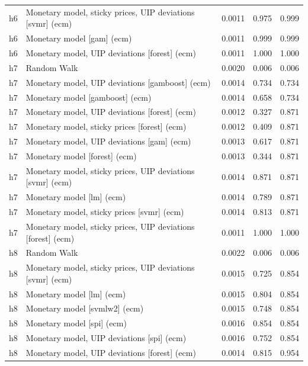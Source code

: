 \begin{ThreePartTable}
\begin{longtable}[t]{cp{5.5cm}ccc}
h6 & \raggedright Monetary model, sticky prices, UIP deviations [svmr] (ecm) & 0.0011 & 0.975 & 0.999\\
h6 & \raggedright Monetary model [gam] (ecm) & 0.0011 & 0.999 & 0.999\\
h6 & \raggedright Monetary model, UIP deviations [forest] (ecm) & 0.0011 & 1.000 & 1.000\\
\addlinespace
h7 & \raggedright Random Walk & 0.0020 & 0.006 & 0.006\\
h7 & \raggedright Monetary model, UIP deviations [gamboost] (ecm) & 0.0014 & 0.734 & 0.734\\
h7 & \raggedright Monetary model [gamboost] (ecm) & 0.0014 & 0.658 & 0.734\\
h7 & \raggedright Monetary model, UIP deviations [forest] (ecm) & 0.0012 & 0.327 & 0.871\\
h7 & \raggedright Monetary model, sticky prices [forest] (ecm) & 0.0012 & 0.409 & 0.871\\
h7 & \raggedright Monetary model, UIP deviations [gam] (ecm) & 0.0013 & 0.617 & 0.871\\
h7 & \raggedright Monetary model [forest] (ecm) & 0.0013 & 0.344 & 0.871\\
h7 & \raggedright Monetary model, sticky prices, UIP deviations [svmr] (ecm) & 0.0014 & 0.871 & 0.871\\
h7 & \raggedright Monetary model [lm] (ecm) & 0.0014 & 0.789 & 0.871\\
h7 & \raggedright Monetary model, sticky prices [svmr] (ecm) & 0.0014 & 0.813 & 0.871\\
h7 & \raggedright Monetary model, sticky prices, UIP deviations [forest] (ecm) & 0.0011 & 1.000 & 1.000\\
\addlinespace
h8 & \raggedright Random Walk & 0.0022 & 0.006 & 0.006\\
h8 & \raggedright Monetary model, sticky prices, UIP deviations [svmr] (ecm) & 0.0015 & 0.725 & 0.854\\
h8 & \raggedright Monetary model [lm] (ecm) & 0.0015 & 0.804 & 0.854\\
h8 & \raggedright Monetary model [svmlw2] (ecm) & 0.0015 & 0.748 & 0.854\\
h8 & \raggedright Monetary model [spi] (ecm) & 0.0016 & 0.854 & 0.854\\
h8 & \raggedright Monetary model, UIP deviations [spi] (ecm) & 0.0016 & 0.752 & 0.854\\
h8 & \raggedright Monetary model, UIP deviations [forest] (ecm) & 0.0014 & 0.815 & 0.954\\

\end{longtable}
\end{ThreePartTable}
